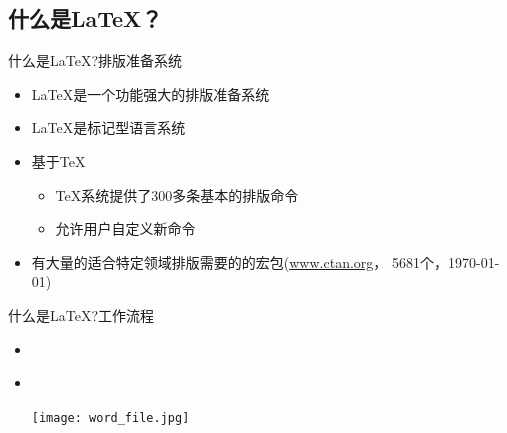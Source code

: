 \documentclass[xcolor=svgnames, t, 10pt]{ctexbeamer}%
\begin{document}
\subsection[是什么？]{什么是\LaTeX ？}\label{sec01-02}
\begin{frame}[t]{什么是\LaTeX?}{排版准备系统}
  \stretchon
  \begin{itemize}
  \item \LaTeX{}是一个功能强大的排版准备系统
  \item \LaTeX{}是标记型语言系统
  \item 基于\TeX
    \begin{itemize}
    \item \TeX{}系统提供了300多条基本的排版命令
    \item 允许用户自定义新命令
    \end{itemize}
  \item 有大量的适合特定领域排版需要的的宏包(\url{www.ctan.org}，
    \alert{5681}个，\today )
  \end{itemize}
  \stretchoff
\end{frame}

\begin{frame}[t]{什么是\LaTeX?}{工作流程}
  \begin{itemize}
  \item \wysiwym\\[4ex]
    \begin{center}
    \end{center}
    \vspace{4ex}
  \item \wysiwyg\\[4ex]
    \begin{center}
      \texttt{[image: word\_file.jpg]}
    \end{center}
  \end{itemize}
\end{frame}
\end{document}
